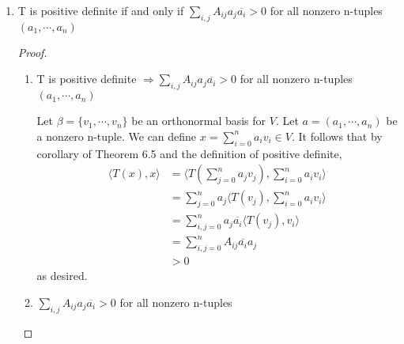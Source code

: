 \documentclass[11pt]{scrartcl}
\begin{document}
\begin{enumerate}[label=\alph*.]
{\begin{proof}
\begin{enumerate}[label=\roman*.]
{\begin{align*}
				                                   & = \sum_{i = 1}^n |c_i|^2 \lambda_i                                     \\
				                                   & > 0
			            \end{align*}
			            as desired.
			            }
		      \end{enumerate}
		      Without loss of generality, the above statements hold for the semidefinite case. Therefore,
		      T is positive definite [semidefinite] if and only if all of its eigenvalues are positive [nonnegative].
	      \end{proof}
	      }
	\item{
	      T is positive definite if and only if $\sum_{i,j} A_{ij} a_j \overline{a_i} >0$
	      for all nonzero n-tuples $(a_1, \cdots, a_n)$
	      \begin{proof}
		      \
		      \begin{enumerate}[label=\roman*.]
			      \item{
			            T is positive definite $\Rightarrow \sum_{i,j} A_{ij} a_j \overline{a_i} >0$
			            for all nonzero n-tuples $(a_1, \cdots, a_n)$\par
			            Let $\beta = \{v_1, \cdots, v_n\}$ be an orthonormal basis for $V$.
			            Let $a = (a_1, \cdots, a_n)$ be a nonzero n-tuple. We can define $x = \sum_{i = 0}^{n} a_i v_i \in V$.
			            It follows that by corollary of Theorem 6.5 and the definition of positive definite,
			            \begin{align*}
				            \langle T(x),x \rangle & =  \langle T(\sum_{j = 0}^{n} a_j v_j),\sum_{i = 0}^{n} a_i v_i \rangle \\
				                                   & = \sum_{j = 0}^{n} a_j \langle T(v_j),\sum_{i = 0}^{n} a_i v_i \rangle  \\
				                                   & = \sum_{i,j = 0}^{n} a_j \overline{a_i}\langle T(v_j),v_i \rangle       \\
				                                   & = \sum_{i,j = 0}^{n} A_{ij} \overline{a_i} a_j                          \\
				                                   & > 0
			            \end{align*}
			            as desired.
			            }
			      \item{
			            $\sum_{i,j} A_{ij} a_j \overline{a_i} >0$ for all nonzero n-tuples
}
\end{enumerate}
\end{proof}}
\end{enumerate}
\end{document}
